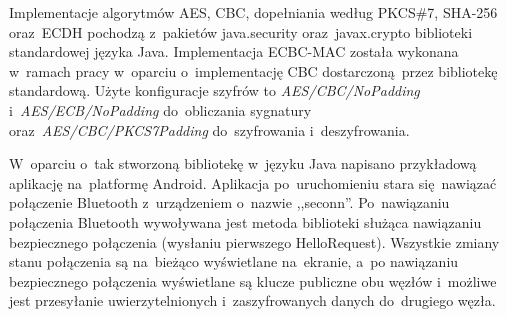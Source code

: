 Implementacje algorytmów AES, CBC, dopełniania według PKCS\#7, SHA-256 oraz~ECDH pochodzą z~pakietów java.security oraz~javax.crypto biblioteki standardowej języka Java. Implementacja ECBC-MAC została wykonana w~ramach pracy w~oparciu o~implementację CBC dostarczoną przez bibliotekę standardową. Użyte konfiguracje szyfrów to \emph{AES/CBC/NoPadding} i~\emph{AES/ECB/NoPadding} do~obliczania sygnatury oraz~\emph{AES/CBC/PKCS7Padding} do~szyfrowania i~deszyfrowania.

W~oparciu o~tak stworzoną bibliotekę w~języku Java napisano przykładową aplikację na~platformę Android. Aplikacja po~uruchomieniu stara się nawiązać połączenie Bluetooth z~urządzeniem o~nazwie ,,seconn''. Po~nawiązaniu połączenia Bluetooth wywoływana jest metoda biblioteki służąca nawiązaniu bezpiecznego połączenia (wysłaniu pierwszego HelloRequest). Wszystkie zmiany stanu połączenia są na~bieżąco wyświetlane na~ekranie, a~po nawiązaniu bezpiecznego połączenia wyświetlane są klucze publiczne obu węzłów i~możliwe jest przesyłanie uwierzytelnionych i~zaszyfrowanych danych do~drugiego węzła.

